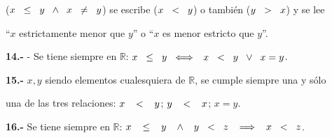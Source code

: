 \documentclass[12pt]{article}
\begin{document}
\begin{center}
     ($x \hspace{0.2cm}\leq \hspace{0.2cm} y \hspace{0.2cm} \wedge \hspace{0.2cm} x \hspace{0.2cm}\neq \hspace{0.2cm} y$) se escribe ($x\hspace{0.2cm}<\hspace{0.2cm}y$) o también ($y\hspace{0.2cm}>\hspace{0.2cm}x$) y se lee 
    \begin{center}
    ``$x$ estrictamente menor que $y$'' o ``$x$ es menor estricto que $y$''.
    \end{center}
\end{center}  
\vspace{0.2cm}

\textbf{14.-} - Se tiene siempre en $\mathbb{R}$: $x\hspace{0.2cm}\leq\hspace{0.2cm} y \hspace{0.2cm} \Longleftrightarrow$ $\hspace{0.2cm} x\hspace{0.2cm}<\hspace{0.2cm}y\hspace{0.2cm} \vee \hspace{0.2cm} x=y$. \newpage


\textbf{15.-} $x,y$ siendo elementos cualesquiera de $\mathbb{R}$, se cumple siempre una y sólo \par una de las tres relaciones: $x\hspace{0.3cm}<\hspace{0.3cm}y$; \hspace{0.3cm}$y\hspace{0.3cm}<\hspace{0.3cm}x$;\hspace{0.3cm} $x=y$. \vspace{0.2cm}


\textbf{16.-}  Se tiene siempre en $\mathbb{R}$: \hspace{0.3cm}$x\hspace{0.3cm}\leq\hspace{0.3cm} y \hspace{0.3cm}\wedge\hspace{0.3cm} y\hspace{0.2cm}<\hspace{0.2cm}z \hspace{0.3cm} \Longrightarrow \hspace{0.3cm} x\hspace{0.2cm}<\hspace{0.2cm}z$.
\vspace{0.3cm}
\end{document}
